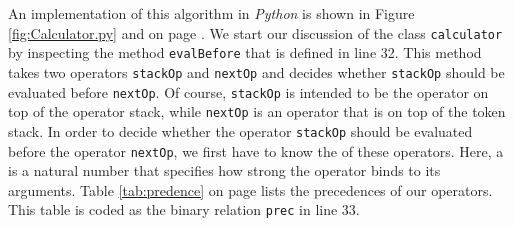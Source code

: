 \noindent
An implementation of this algorithm in \textsl{Python} is shown in  Figure
\ref{fig:Calculator.py} and on page \pageref{fig:Calculator.py}.
We start our discussion of the class \texttt{calculator} by inspecting the method
\texttt{evalBefore} that is defined in line 32.
This method takes two operators \texttt{stackOp} and \texttt{nextOp} and decides
whether \texttt{stackOp} should be evaluated before \texttt{nextOp}.  Of course, \texttt{stackOp} is
intended to be the operator on top of the operator stack, while \texttt{nextOp} is an operator that
is on top of the token stack.
In order to decide whether the operator \texttt{stackOp} should be evaluated before the operator
\texttt{nextOp},  we first have to know the  of these operators.  Here, a
 is a natural number that specifies how strong the operator binds to its
arguments. Table \ref{tab:predence} on page \pageref{tab:predence} lists the precedences of our
operators.  This table is coded as the binary relation \texttt{prec} in line 33.

\begin{table}[!h]
  \centering
{}
  \caption{Precedences of the operators.}
  \label{tab:predence}
\end{table}

